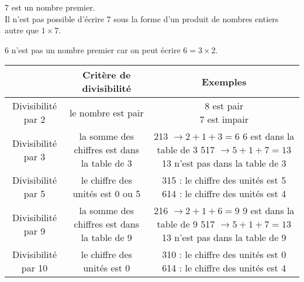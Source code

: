 \documentclass[../Cours.tex]{subfiles}
\begin{document}
\setcounter{chapitre}{30}

\begin{listedexemples}
    \item 7 est un nombre premier. \\Il n'est pas possible d'écrire 7 sous la forme d'un produit de nombres entiers autre que $1 \times 7$. 
    \item 6 n'est pas un nombre premier car on peut écrire $6 = 3 \times 2$.
\end{listedexemples}


\begin{center}
\begin{tabular}{|c|c|c|}\hline
     & Critère de divisibilité & Exemples  \\\hline
    Divisibilité par 2 & le nombre est pair & \makecell{\textcolor{vert}{8 est pair} \\ \textcolor{rouge}{7 est impair}}  \\\hline
    Divisibilité par 3 & la somme des chiffres est dans la table de 3 & \makecell{\textcolor{vert}{213 $\longrightarrow 2 + 1 + 3 = 6$} \\ \textcolor{vert}{6 est dans la table de 3} \\ \textcolor{rouge}{517 $\longrightarrow 5 + 1 + 7 = 13$} \\ \textcolor{rouge}{13 n'est pas dans la table de 3}} \\\hline
    Divisibilité par 5 & le chiffre des unités est 0 ou 5 & \makecell{\textcolor{vert}{315 : le chiffre des unités est 5} \\ \textcolor{rouge}{614 : le chiffre des unités est 4}} \\\hline
    Divisibilité par 9 & la somme des chiffres est dans la table de 9 & \makecell{\textcolor{vert}{216 $\longrightarrow 2 + 1 + 6 = 9$} \\ \textcolor{vert}{9 est dans la table de 9} \\ \textcolor{rouge}{517 $\longrightarrow 5 + 1 + 7 = 13$} \\ \textcolor{rouge}{13 n'est pas dans la table de 9}} \\\hline
    Divisibilité par 10 & le chiffre des unités est 0 & \makecell{\textcolor{vert}{310 : le chiffre des unités est 0} \\ \textcolor{rouge}{614 : le chiffre des unités est 4}} \\\hline
\end{tabular}
\end{center}
\end{document}
